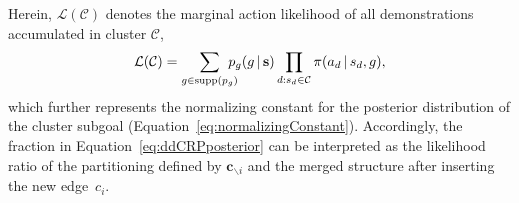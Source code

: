\documentclass[twoside,11pt]{article}
\newcommand{\p}{p}
\newcommand{\given}{\,\vert\,}
\newcommand{\supp}{\text{supp}}
\newcommand{\softmax}{{\pi}}
\newcommand{\without}{\backslash}
\newcommand{\eqkomma}{,}
\begin{document}
Herein, $\mathcal{L}(\mathcal{C})$ denotes the marginal action likelihood of all demonstrations %
accumulated in cluster $\mathcal{C}$,
%
%
%
\begin{equation}
\mathcal{L}(\mathcal{C}) = \displaystyle \sum_{g\in\supp(p_g)} \hspace{-0.3cm} \p_g(g  \given \mathbf{s}) \prod\limits_{d:s_d\in\mathcal{C}} \softmax(a_d \given s_d, g) \eqkomma
\label{eq:marginalActionLikelihood}
\end{equation}
which %
further %
represents the normalizing constant for the posterior distribution of the cluster subgoal (Equation~\ref{eq:normalizingConstant}).
Accordingly, the fraction in Equation~\eqref{eq:ddCRPposterior} can be interpreted as the likelihood ratio of the %
partitioning defined by $\mathbf{c}_{\without i}$ and the merged structure after inserting the new edge~$c_i$.
\end{document}

